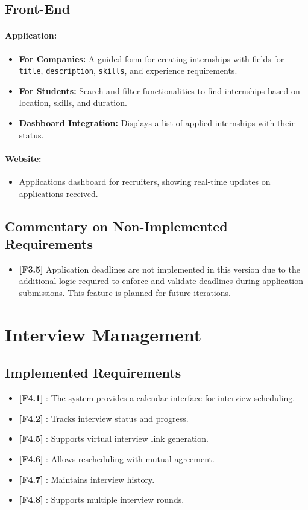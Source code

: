 \subsection*{Front-End}
\paragraph{Application:}
\begin{itemize}
    \item \textbf{For Companies:} A guided form for creating internships with fields for \texttt{title}, \texttt{description}, \texttt{skills}, and experience requirements.
    \item \textbf{For Students:} Search and filter functionalities to find internships based on location, skills, and duration.
    \item \textbf{Dashboard Integration:} Displays a list of applied internships with their status.
\end{itemize}

\paragraph{Website:}
\begin{itemize}
    \item Applications dashboard for recruiters, showing real-time updates on applications received.
\end{itemize}

\subsection*{Commentary on Non-Implemented Requirements}
\begin{itemize}
    \item \textbf{[F3.5]} Application deadlines are not implemented in this version due to the additional logic required to enforce and validate deadlines during application submissions. This feature is planned for future iterations.
\end{itemize}

\section{Interview Management}
\subsection*{Implemented Requirements}
\begin{itemize}
    \item \textbf{[F4.1]} : The system provides a calendar interface for interview scheduling.
    \item \textbf{[F4.2]} : Tracks interview status and progress.
    \item \textbf{[F4.5]} : Supports virtual interview link generation.
    \item \textbf{[F4.6]} : Allows rescheduling with mutual agreement.
    \item \textbf{[F4.7]} : Maintains interview history.
    \item \textbf{[F4.8]} : Supports multiple interview rounds.
\end{itemize}

